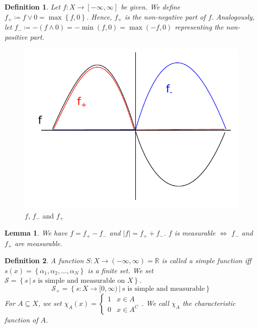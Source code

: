\documentclass{article}
\newtheorem{definition}{Definition}  \numberwithin{definition}{section}
\newtheorem{lemma}{Lemma}  \numberwithin{lemma}{section}
\newcommand{\set}[1]{\left\{#1\right\}}
\newcommand{\setdef}[2]{\left\{\left.#1\,\right|\,#2\right\}}
\newcommand{\card}[1]{\left|#1\right|}
\begin{document}
\begin{definition}
  Let $f: X \to [-\infty, \infty]$ be given. We define $f_+ \coloneqq f \lor 0 = \max\set{f, 0}$.
  Hence, $f_+$ is the non-negative part of $f$.
  Analogously, let $f_- \coloneqq -(f \land 0) = -\min(f, 0) = \max(-f, 0)$ representing the non-positive part.
\end{definition}
\begin{figure}[!h]
	\begin{center}
	  \includegraphics{img/14_fpm.pdf}
	  \caption{$f$, $f_-$ and $f_+$}
	\end{center}
\end{figure}

\begin{lemma}
  We have $f = f_+ - f_{-}$ and $\card{f} = f_{+} + f_{-}$.
  $f$ is measurable $\iff$ $f_-$ and $f_+$ are measurable.
\end{lemma}
\begin{definition}
  A function $S: X \to (-\infty, \infty) = \mathbb R$ is called a simple function iff
  $s(x) = \set{\alpha_1, \alpha_2, \ldots, \alpha_N}$ is a finite set.
  We set $\mathcal S = \setdef{s}{s \text{ is simple and measurable on } X}$.
  \[ \mathcal S_+ = \setdef{s: X \to [0, \infty)}{s \text{ is simple and measurable}} \]
  For $A \subseteq X$, we set $\chi_A(x) = \begin{cases} 1 & x \in A \\ 0 & x \in A^C \end{cases}$.
  We call $\chi_A$ the characteristic function of $A$.
\end{definition}
\end{document}
